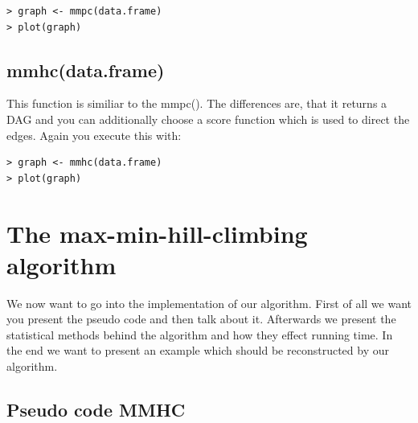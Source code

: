 		\begin{verbatim}
> graph <- mmpc(data.frame)
> plot(graph)
		\end{verbatim}

	\section{mmhc(data.frame)}

		This function is similiar to the mmpc(). The differences are, that it returns a DAG and you can additionally choose a score function which is used to direct the edges. Again you execute this with:

		\begin{verbatim}
> graph <- mmhc(data.frame)
> plot(graph)
		\end{verbatim}

\chapter{The max-min-hill-climbing algorithm}

	We now want to go into the implementation of our algorithm. First of all we want you present the pseudo code and then talk about it. Afterwards we present the statistical methods behind the algorithm and how they effect running time. In the end we want to present an example which should be reconstructed by our algorithm.

	\section{Pseudo code MMHC}

		 \label{img.mmhc}

